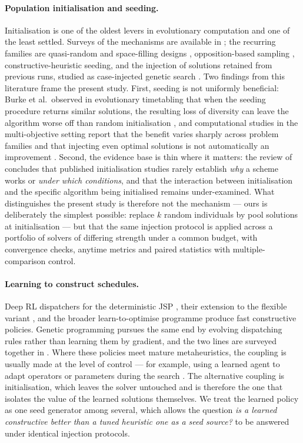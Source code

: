 \documentclass[review]{elsarticle}
\begin{document}
\paragraph{Population initialisation and seeding.} Initialisation is one of
the oldest levers in evolutionary computation and one of the least settled.
Surveys of the mechanisms are available in
\cite{Kazimipour2014,Agushaka2022,Sarhani2023}; the recurring families are
quasi-random and space-filling designs \cite{Maaranen2004}, opposition-based
sampling \cite{Rahnamayan2008}, constructive-heuristic seeding, and the
injection of solutions retained from previous runs, studied as case-injected
genetic search \cite{Louis2004}. Two findings from this literature frame the
present study. First, seeding is not uniformly beneficial: Burke et
al.\ observed in evolutionary timetabling that when the seeding procedure
returns similar solutions, the resulting loss of diversity can leave the
algorithm worse off than random initialisation \cite{Burke1998}, and
computational studies in the multi-objective setting report that the benefit
varies sharply across problem families \cite{Friedrich2015} and that
injecting even optimal solutions is not automatically an improvement
\cite{Gong2023,Gong2023few}. Second, the evidence base is thin where it
matters: the review of \cite{Sarhani2023} concludes that published
initialisation studies rarely establish \emph{why} a scheme works or
\emph{under which conditions}, and that the interaction between
initialisation and the specific algorithm being initialised remains
under-examined. What distinguishes the present study is therefore not the
mechanism --- ours is deliberately the simplest possible: replace $k$ random
individuals by pool solutions at initialisation --- but that the same
injection protocol is applied across a portfolio of solvers of differing
strength under a common budget, with convergence checks, anytime metrics and
paired statistics with multiple-comparison control.

\paragraph{Learning to construct schedules.} Deep RL dispatchers for the
deterministic JSP \cite{ZhangL2D2020,Park2021}, their extension to the
flexible variant \cite{Song2023}, and the broader learn-to-optimise
programme \cite{Bengio2021,Kotary2021} produce fast constructive policies.
Genetic programming pursues the same end by evolving dispatching rules
rather than learning them by gradient, and the two lines are surveyed
together in \cite{ZhangGP2024}. Where these policies meet mature
metaheuristics, the coupling is usually made at the level of control --- for
example, using a learned agent to adapt operators or parameters during the
search \cite{Ma2025}. The alternative coupling is initialisation, which
leaves the solver untouched and is therefore the one that isolates the value
of the learned solutions themselves. We treat the learned policy as one seed
generator among several, which allows the question \emph{is a learned
constructive better than a tuned heuristic one as a seed source?} to be
answered under identical injection protocols.
\end{document}
